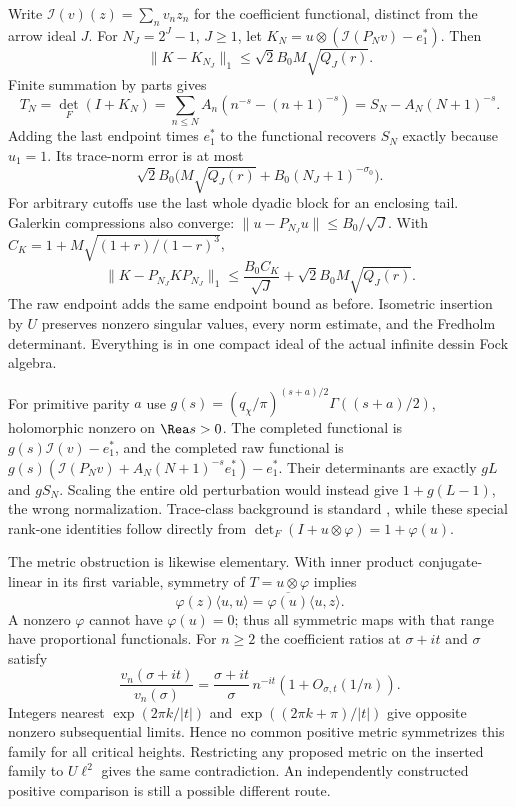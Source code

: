 \documentclass[11pt,oneside,openany]{book}
\theoremstyle{definition}\newtheorem{definition}[theorem]{Definition}
\theoremstyle{remark}\newtheorem{remark}[theorem]{Remark}
\begin{document}
Write $\mathcal I(v)(z)=\sum_n v_nz_n$ for the coefficient functional, distinct from the arrow ideal $J$. For $N_J=2^J-1$, $J\ge1$, let $K_N=u\otimes(\mathcal I(P_Nv)-e_1^*)$. Then
\[
 \|K-K_{N_J}\|_1\le\sqrt2 B_0M\sqrt{Q_J(r)}.
\]
Finite summation by parts gives
\[
 T_N=\det_F(I+K_N)
 =\sum_{n\le N}A_n(n^{-s}-(n+1)^{-s})
 =S_N-A_N(N+1)^{-s}.
\]
Adding the last endpoint times $e_1^*$ to the functional recovers $S_N$ exactly because $u_1=1$. Its trace-norm error is at most
\[
 \sqrt2 B_0\bigl(M\sqrt{Q_J(r)}+B_0(N_J+1)^{-\sigma_0}\bigr).
\]
For arbitrary cutoffs use the last whole dyadic block for an enclosing tail. Galerkin compressions also converge: $\|u-P_{N_J}u\|\le B_0/\sqrt J$. With $C_K=1+M\sqrt{(1+r)/(1-r)^3}$,
\[
 \|K-P_{N_J}KP_{N_J}\|_1
 \le\frac{B_0 C_K}{\sqrt J}+\sqrt2 B_0M\sqrt{Q_J(r)}.
\]
The raw endpoint adds the same endpoint bound as before. Isometric insertion by $U$ preserves nonzero singular values, every norm estimate, and the Fredholm determinant. Everything is in one compact ideal of the actual infinite dessin Fock algebra.

For primitive parity $a$ use $g(s)=(q_\chi/\pi)^{(s+a)/2}\Gamma((s+a)/2)$, holomorphic nonzero on $\Rea s>0$. The completed functional is $g(s)\mathcal I(v)-e_1^*$, and the completed raw functional is $g(s)(\mathcal I(P_Nv)+A_N(N+1)^{-s}e_1^*)-e_1^*$. Their determinants are exactly $gL$ and $gS_N$. Scaling the entire old perturbation would instead give $1+g(L-1)$, the wrong normalization. Trace-class background is standard \cite{Bornemann}, while these special rank-one identities follow directly from $\det_F(I+u\otimes\varphi)=1+\varphi(u)$.

The metric obstruction is likewise elementary. With inner product conjugate-linear in its first variable, symmetry of $T=u\otimes\varphi$ implies
\[
 \varphi(z)\langle u,u\rangle=\overline{\varphi(u)}\langle u,z\rangle.
\]
A nonzero $\varphi$ cannot have $\varphi(u)=0$; thus all symmetric maps with that range have proportional functionals. For $n\ge2$ the coefficient ratios at $\sigma+it$ and $\sigma$ satisfy
\[
 \frac{v_n(\sigma+it)}{v_n(\sigma)}
 =\frac{\sigma+it}{\sigma}\,n^{-it}(1+O_{\sigma,t}(1/n)).
\]
Integers nearest $\exp(2\pi k/|t|)$ and $\exp((2\pi k+\pi)/|t|)$ give opposite nonzero subsequential limits. Hence no common positive metric symmetrizes this family for all critical heights. Restricting any proposed metric on the inserted family to $U\ell^2$ gives the same contradiction. An independently constructed positive comparison is still a possible different route.
\end{document}
